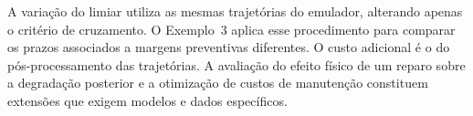 A variação do limiar utiliza as mesmas trajetórias do emulador, alterando apenas o critério de cruzamento. O Exemplo~3 aplica esse procedimento para comparar os prazos associados a margens preventivas diferentes. O custo adicional é o do pós-processamento das trajetórias. A avaliação do efeito físico de um reparo sobre a degradação posterior e a otimização de custos de manutenção constituem extensões que exigem modelos e dados específicos.
